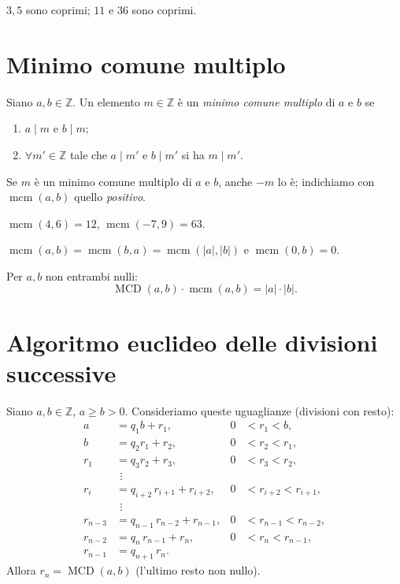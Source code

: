 \documentclass[11pt,a4paper]{article}
\begin{document}
\begin{esempio}
$3, 5$ sono coprimi; $11$ e $36$ sono coprimi.
\end{esempio}

\section{Minimo comune multiplo}

\begin{definizione}
Siano $a, b \in \mathbb{Z}$. Un elemento $m \in \mathbb{Z}$ è un \emph{minimo comune multiplo} di $a$ e $b$ se
\begin{enumerate}
  \item[i)] $a \mid m$ e $b \mid m$;
  \item[ii)] $\forall m' \in \mathbb{Z}$ tale che $a \mid m'$ e $b \mid m'$ si ha $m \mid m'$.
\end{enumerate}
\end{definizione}

Se $m$ è un minimo comune multiplo di $a$ e $b$, anche $-m$ lo è; indichiamo con $\operatorname{mcm}(a, b)$ quello \emph{positivo}.

\begin{esempio}
$\operatorname{mcm}(4, 6) = 12$, \quad $\operatorname{mcm}(-7, 9) = 63$.
\end{esempio}

\begin{proprieta}
$\operatorname{mcm}(a, b) = \operatorname{mcm}(b, a) = \operatorname{mcm}(|a|, |b|)$ e $\operatorname{mcm}(0, b) = 0$.
\end{proprieta}

\begin{proprieta}[Formula]
Per $a, b$ non entrambi nulli:
\[
  \operatorname{MCD}(a, b)\cdot\operatorname{mcm}(a, b) = |a|\cdot|b| .
\]
\end{proprieta}

\section{Algoritmo euclideo delle divisioni successive}

\begin{teorema}
Siano $a, b \in \mathbb{Z}$, $a \ge b > 0$. Consideriamo queste uguaglianze (divisioni con resto):
\begin{align*}
  a &= q_1 b + r_1, & 0 &< r_1 < b,\\
  b &= q_2 r_1 + r_2, & 0 &< r_2 < r_1,\\
  r_1 &= q_3 r_2 + r_3, & 0 &< r_3 < r_2,\\
  &\ \,\vdots\\
  r_i &= q_{i+2}\, r_{i+1} + r_{i+2}, & 0 &< r_{i+2} < r_{i+1},\\
  &\ \,\vdots\\
  r_{n-3} &= q_{n-1}\, r_{n-2} + r_{n-1}, & 0 &< r_{n-1} < r_{n-2},\\
  r_{n-2} &= q_n\, r_{n-1} + r_n, & 0 &< r_n < r_{n-1},\\
  r_{n-1} &= q_{n+1}\, r_n .
\end{align*}
Allora $r_n = \operatorname{MCD}(a, b)$ (l'ultimo resto non nullo).
\end{teorema}
\end{document}
